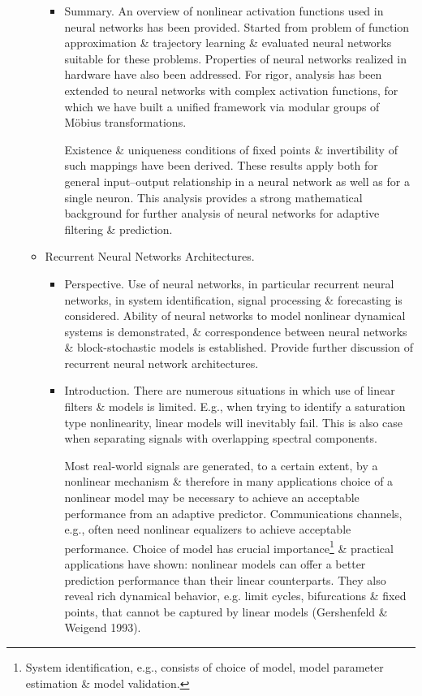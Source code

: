 \documentclass{article}
\begin{document}
\begin{enumerate}
\begin{itemize}
\begin{itemize}
			\item {\sf Summary.} An overview of nonlinear activation functions used in neural networks has been provided. Started from problem of function approximation \& trajectory learning \& evaluated neural networks suitable for these problems. Properties of neural networks realized in hardware have also been addressed. For rigor, analysis has been extended to neural networks with complex activation functions, for which we have built a unified framework via modular groups of M\"obius transformations.
			
			Existence \& uniqueness conditions of fixed points \& invertibility of such mappings have been derived. These results apply both for general input--output relationship in a neural network as well as for a single neuron. This analysis provides a strong mathematical background for further analysis of neural networks for adaptive filtering \& prediction.
		\end{itemize}
		\item {\sf Recurrent Neural Networks Architectures.}
		\begin{itemize}
			\item {\sf Perspective.} Use of neural networks, in particular recurrent neural networks, in system identification, signal processing \& forecasting is considered. Ability of neural networks to model nonlinear dynamical systems is demonstrated, \& correspondence between neural networks \& block-stochastic models is established. Provide further discussion of recurrent neural network architectures.
			\item {\sf Introduction.} There are numerous situations in which use of linear filters \& models is limited. E.g., when trying to identify a saturation type nonlinearity, linear models will inevitably fail. This is also case when separating signals with overlapping spectral components.
			
			Most real-world signals are generated, to a certain extent, by a nonlinear mechanism \& therefore in many applications choice of a nonlinear model may be necessary to achieve an acceptable performance from an adaptive predictor. Communications channels, e.g., often need nonlinear equalizers to achieve acceptable performance. Choice of model has crucial importance\footnote{System identification, e.g., consists of choice of model, model parameter estimation \& model validation.} \& practical applications have shown: nonlinear models can offer a better prediction performance than their linear counterparts. They also reveal rich dynamical behavior, e.g. limit cycles, bifurcations \& fixed points, that cannot be captured by linear models (Gershenfeld \& Weigend 1993).
			

\end{itemize}
\end{itemize}
\end{enumerate}
\end{document}
